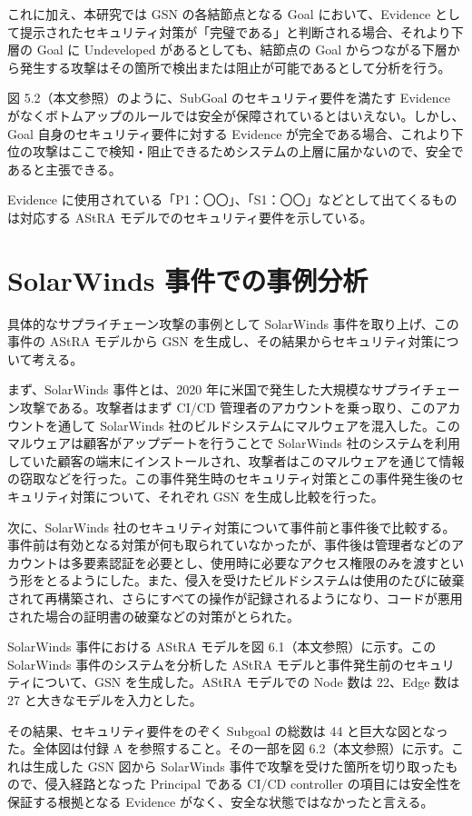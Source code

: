 \documentclass[paper]{ieicej} %
\begin{document}
これに加え、本研究では GSN の各結節点となる Goal において、Evidence として提示されたセキュリティ対策が「完璧である」と判断される場合、それより下層の Goal に Undeveloped があるとしても、結節点の Goal からつながる下層から発生する攻撃はその箇所で検出または阻止が可能であるとして分析を行う。

図 5.2（本文参照）のように、SubGoal のセキュリティ要件を満たす Evidence がなくボトムアップのルールでは安全が保障されているとはいえない。しかし、Goal 自身のセキュリティ要件に対する Evidence が完全である場合、これより下位の攻撃はここで検知・阻止できるためシステムの上層に届かないので、安全であると主張できる。

Evidence に使用されている「P1：〇〇」、「S1：〇〇」などとして出てくるものは対応する AStRA モデルでのセキュリティ要件を示している。

\section{SolarWinds 事件での事例分析}
具体的なサプライチェーン攻撃の事例として SolarWinds 事件を取り上げ、この事件の AStRA モデルから GSN を生成し、その結果からセキュリティ対策について考える。

まず、SolarWinds 事件とは、2020 年に米国で発生した大規模なサプライチェーン攻撃である。攻撃者はまず CI/CD 管理者のアカウントを乗っ取り、このアカウントを通して SolarWinds 社のビルドシステムにマルウェアを混入した。このマルウェアは顧客がアップデートを行うことで SolarWinds 社のシステムを利用していた顧客の端末にインストールされ、攻撃者はこのマルウェアを通じて情報の窃取などを行った。この事件発生時のセキュリティ対策とこの事件発生後のセキュリティ対策について、それぞれ GSN を生成し比較を行った。

次に、SolarWinds 社のセキュリティ対策について事件前と事件後で比較する。事件前は有効となる対策が何も取られていなかったが、事件後は管理者などのアカウントは多要素認証を必要とし、使用時に必要なアクセス権限のみを渡すという形をとるようにした。また、侵入を受けたビルドシステムは使用のたびに破棄されて再構築され、さらにすべての操作が記録されるようになり、コードが悪用された場合の証明書の破棄などの対策がとられた。

SolarWinds 事件における AStRA モデルを図 6.1（本文参照）に示す。この SolarWinds 事件のシステムを分析した AStRA モデルと事件発生前のセキュリティについて、GSN を生成した。AStRA モデルでの Node 数は 22、Edge 数は 27 と大きなモデルを入力とした。

その結果、セキュリティ要件をのぞく Subgoal の総数は 44 と巨大な図となった。全体図は付録 A を参照すること。その一部を図 6.2（本文参照）に示す。これは生成した GSN 図から SolarWinds 事件で攻撃を受けた箇所を切り取ったもので、侵入経路となった Principal である CI/CD controller の項目には安全性を保証する根拠となる Evidence がなく、安全な状態ではなかったと言える。
\end{document}
